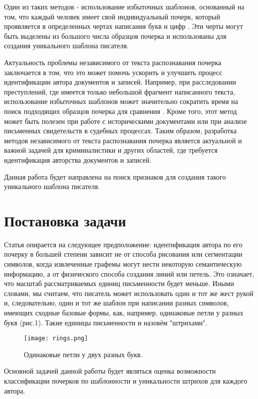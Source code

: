 \documentclass{article}
\begin{document}
Один из таких методов - использование избыточных шаблонов, основанный на том, что каждый человек имеет свой индивидуальный почерк, который проявляется в определенных чертах написания букв и цифр \citep{2010PatRe..43.3853S}. Эти черты могут быть выделены из большого числа образцов почерка и использованы для создания уникального шаблона писателя.

Актуальность проблемы независимого от текста распознавания почерка заключается в том, что это может помочь ускорить и улучшить процесс идентификации автора документов и записей. Например, при расследовании преступлений, где имеется только небольшой фрагмент написанного текста, использование избыточных шаблонов может значительно сократить время на поиск подходящих образцов почерка для сравнения \citep{inbook}. Кроме того, этот метод может быть полезен при работе с историческими документами или при анализе письменных свидетельств в судебных процессах. Таким образом, разработка методов независимого от текста распознавания почерка является актуальной и важной задачей для криминалистики и других областей, где требуется идентификация авторства документов и записей.

Данная работа будет направлена на поиск признаков для создания такого уникального шаблона писателя.

\section{Постановка задачи}
Статья опирается на следующее предположение: идентификация автора по его почерку в большей степени зависит не от способа рисования или сегментации символов, когда извлеченные графемы могут нести некоторую семантическую информацию, а от физического способа создания линий или петель. Это означает, что масштаб рассматриваемых единиц письменности будет меньше. Иными словами, мы считаем, что писатель может использовать один и тот же жест рукой и, следовательно, один и тот же шаблон при написании разных символов, имеющих сходные базовые формы, как, например, одинаковые петли у разных букв (рис.1). Такие единицы письменности и назовём "штрихами".
\begin{figure}[h]
    \centering
    \texttt{[image: rings.png]}
    \caption{Одинаковые петли у двух разных букв.}
\end{figure}

Основной задачей данной работы будет являться оценка возможности классификации почерков по шаблонности и уникальности штрихов для каждого автора.
\end{document}

